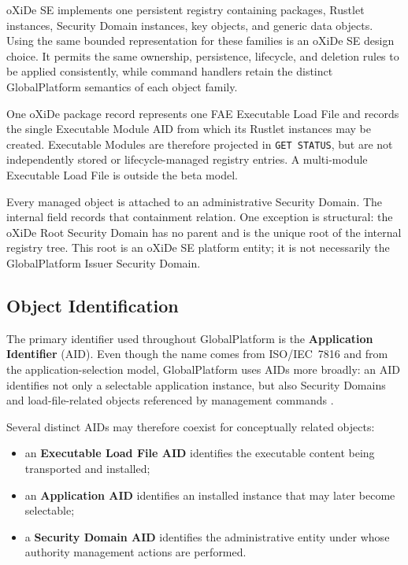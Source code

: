 oXiDe SE implements one persistent registry containing packages, Rustlet
instances, Security Domain instances, key objects, and generic data objects.
Using the same bounded representation for these families is an oXiDe SE design
choice. It permits the same ownership, persistence, lifecycle, and deletion
rules to be applied consistently, while command handlers retain the distinct
GlobalPlatform semantics of each object family.

One oXiDe package record represents one FAE Executable Load File and records
the single Executable Module AID from which its Rustlet instances may be
created. Executable Modules are therefore projected in \texttt{GET STATUS},
but are not independently stored or lifecycle-managed registry entries. A
multi-module Executable Load File is outside the beta model.

Every managed object is attached to an administrative Security Domain. The
internal field  records that containment relation. One
exception is structural: the oXiDe Root Security Domain has no parent and is
the unique root of the internal registry tree. This root is an oXiDe SE
platform entity; it is not necessarily the GlobalPlatform Issuer Security
Domain.

\subsection{Object Identification}
\label{sec:gp-object-identification}


The primary identifier used throughout GlobalPlatform is the
\textbf{Application Identifier} (AID). Even though the name comes from
ISO/IEC~7816 and from the application-selection model, GlobalPlatform
uses AIDs more broadly: an AID identifies not only a selectable
application instance, but also Security Domains and load-file-related
objects referenced by management commands .

Several distinct AIDs may therefore coexist for conceptually related
objects:

\begin{itemize}
\item an \textbf{Executable Load File AID} identifies the executable content being
  transported and installed;
\item an \textbf{Application AID} identifies an installed instance that
  may later become selectable;
\item a \textbf{Security Domain AID} identifies the administrative
  entity under whose authority management actions are performed.
\end{itemize}

